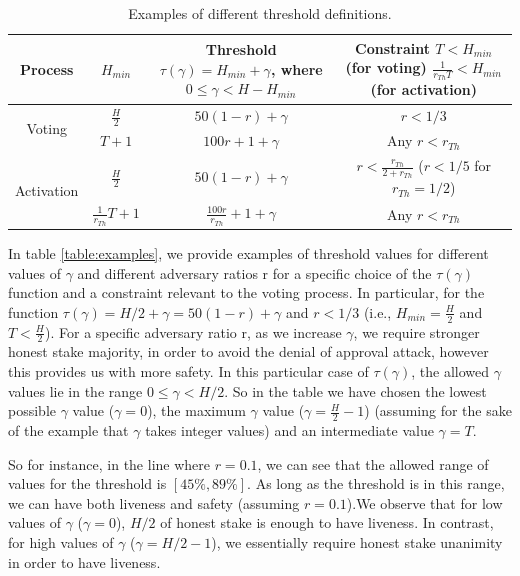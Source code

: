 \documentclass[11pt,a4paper]{article}
\begin{document}
\begin{table}[h!]
	\centering
	\begin{tabular}{ | c | c | c | c |}
		\hline
		\textbf{Process} & $H_{min}$ & \makecell[c]{\textbf{Threshold}\\
		$\tau(\gamma) =
		H_{min} + \gamma$,\\ where $0 \leq \gamma < H-H_{min}$} &
		\makecell[c]{\textbf{Constraint}\\$T < H_{min}$ (for voting)\\
		$\frac{1}{r_{Th}T} < H_{min}$
		(for activation)} \\
		\hline
		\multirow{2}{*}{Voting} & $\frac{H}{2}$ &
		$50(1-r)+\gamma$ & $r < 1/3$
		 \\
		 & $T+1$ & $100r + 1 +\gamma$ & Any $r < r_{Th}$ \\
		\hline
		\multirow{2}{*}{Activation} & $\frac{H}{2}$ &
		$50(1-r)+\gamma$ &
		\makecell[c]{$r < \frac{r_{Th}}{2+r_{Th}}$ \\ ($r < 1/5$ for
		$r_{Th} = 1/2$)}
		\\
		 & $\frac{1}{r_{Th}}T + 1$ &
		$\frac{100r}{r_{Th}} + 1 + \gamma$ & Any $r < r_{Th}$ \\
		\hline
	\end{tabular}
	\caption{Examples of different threshold definitions.}
	\label{table:threshold_examples}
\end{table}

In table \ref{table:examples}, we provide examples of threshold values for
different values of
$\gamma$ and different adversary ratios r for a specific choice of the
$\tau(\gamma)$ function and a constraint relevant to the voting process. In
particular, for the function $\tau(\gamma) = H/2 + \gamma =
50(1-r)+\gamma$ and $r < 1/3$ (i.e., $H_{min} = \frac{H}{2}$ and $T <
\frac{H}{2}$). For a specific adversary ratio r, as we increase
$\gamma$, we require stronger honest stake majority, in order to avoid the
denial of approval attack, however this provides us with more safety. In this
particular case of $\tau(\gamma)$, the allowed
$\gamma$ values lie in the range $0 \leq \gamma <
H/2$. So in the table we have chosen the lowest possible
$\gamma$ value ($\gamma=0$), the maximum $\gamma$ value ($\gamma = \frac{H}{2} -
1$) (assuming for the sake of the example that
$\gamma$ takes integer values) and an intermediate value $\gamma = T$.

So for instance, in the line where $r=0.1$, we can see that the allowed range of
values for the threshold is $[45\%, 89\%]$. As long as the threshold is in this
range, we can have both liveness and safety (assuming $r=0.1$).We observe that
for low values of $\gamma$ ($\gamma = 0$), $H/2$ of honest stake is enough to
have liveness. In contrast, for high values of $\gamma$ ($\gamma = H/2 -1$), we
essentially require honest stake unanimity in order to have liveness.
\end{document}
